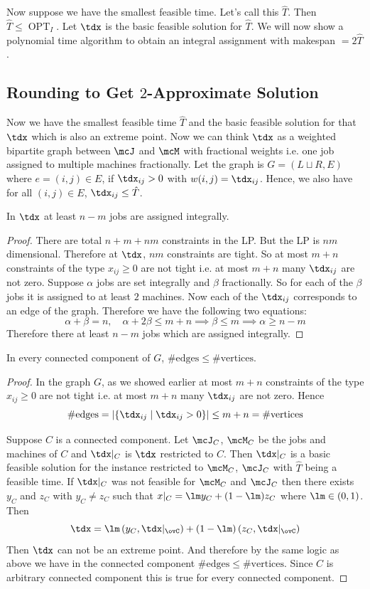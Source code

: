 Now suppose we have the smallest feasible time. Let's call this $\hat{T}$. Then $\hat{T}\leq \operatorname{OPT}_I$. Let $\tdx$ is the basic feasible solution for $\hat{T}$. We will now show a polynomial time algorithm to obtain an integral assignment with makespan $=2\hat{T}$.

\subsection{Rounding to Get \texorpdfstring{$2$}{2}-Approximate Solution}
Now we have the smallest feasible time $\hat{T}$ and the basic feasible solution for that $\tdx$ which is also an extreme point. Now we can think $\tdx$ as a weighted bipartite graph between $\mcJ$ and $\mcM$ with fractional weights i.e. one job assigned to multiple machines fractionally. Let the graph is $G=(L\sqcup R,E)$ where $e=(i,j)\in E$, if $\tdx_{ij}>0$ with $w(i,j)=\tdx_{ij}$. Hence, we also have for all $(i,j)\in E$, $\tdx_{ij}\leq \hat{T}$. 
\begin{lemma}{}{}
	In $\tdx$ at least $n-m$ jobs are assigned integrally.
\end{lemma}
\begin{proof}
	There are total $n+m+nm$ constraints in the LP. But the LP is $nm$ dimensional. Therefore at $\tdx$, $nm$ constraints are tight. So at most $m+n$ constraints of the type $x_{ij}\geq 0$ are not tight i.e.  at most $m+n$ many $\tdx_{ij}$ are not zero. Suppose $\alpha$ jobs are set integrally and $\beta $ fractionally. So for each of the $\beta $ jobs it is assigned to at least  $2$ machines. Now each of the $\tdx_{ij}$ corresponds to an edge of the graph. Therefore we have the following two equations:$$\alpha+\beta=n,\quad \alpha+2\beta\leq m+n\implies \beta\leq m\implies \alpha\geq n-m$$Therefore there at least $n-m$ jobs which are assigned integrally.
\end{proof}
\begin{lemma}{}{}
	In every connected component of $G$, $\#\text{edges}\leq \#\text{vertices}$.
\end{lemma}
\begin{proof}
	In the graph $G$, as we showed earlier at most $m+n$ constraints of the type $x_{ij}\geq 0$ are not tight i.e.  at most $m+n$ many $\tdx_{ij}$ are not zero. Hence $$\#\text{edges}=|\{\tdx_{ij}\mid \tdx_{ij}>0\}|\leq m+n=\#\text{vertices}$$

	Suppose $C$ is a connected component. Let $\mcJ_C$, $\mcM_C$ be the jobs and machines of $C$ and $\tdx|_C$ is $\tdx$ restricted to $C$. Then $\tdx|_C$ is a basic feasible solution for the instance restricted to $\mcM_C$, $\mcJ_C$ with $\hat{T}$ being a feasible time. If $\tdx|_C$ was not feasible for $\mcM_C$ and $\mcJ_C$ then there exists $y_C$ and $z_C$ with $y_C\neq z_C$ such that $x|_C=\lm y_C+(1-\lm)z_C$ where $\lm\in(0,1)$. Then $$\tdx=\lm\lt(y_C,\tdx|_{\ovC}\rt)+(1-\lm)\lt(z_C,\tdx|_{\ovC}\rt)$$ Then $\tdx$ can not be an extreme point. And therefore by the same logic as above we have in the connected component $\#\text{edges}\leq \#\text{vertices}$. Since $C$ is arbitrary connected component this is true for every connected component.
\end{proof}
 
